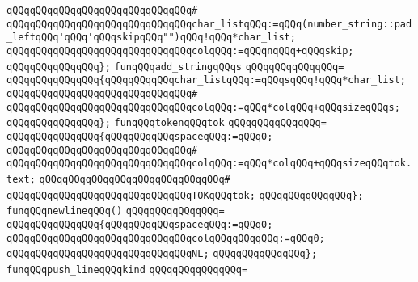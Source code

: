 \verb|qQQqqQQqqQQqqQQqqQQqqQQqqQQqqQQq#|\newline
\verb|qQQqqQQqqQQqqQQqqQQqqQQqqQQqqQQqchar_listqQQq:=qQQq(number_string::pad_leftqQQq'qQQq'qQQqskipqQQq"")qQQq!qQQq*char_list;|\newline
\verb|qQQqqQQqqQQqqQQqqQQqqQQqqQQqqQQqcolqQQq:=qQQqnqQQq+qQQqskip;|\newline
\verb|qQQqqQQqqQQqqQQq};|\newline
\newline
\verb|funqQQqadd_stringqQQqs|\newline
\verb|qQQqqQQqqQQqqQQq=|\newline
\verb|qQQqqQQqqQQqqQQq{qQQqqQQqqQQqchar_listqQQq:=qQQqsqQQq!qQQq*char_list;|\newline
\verb|qQQqqQQqqQQqqQQqqQQqqQQqqQQqqQQq#|\newline
\verb|qQQqqQQqqQQqqQQqqQQqqQQqqQQqqQQqcolqQQq:=qQQq*colqQQq+qQQqsizeqQQqs;|\newline
\verb|qQQqqQQqqQQqqQQq};|\newline
\newline
\verb|funqQQqtokenqQQqtok|\newline
\verb|qQQqqQQqqQQqqQQq=|\newline
\verb|qQQqqQQqqQQqqQQq{qQQqqQQqqQQqspaceqQQq:=qQQq0;|\newline
\verb|qQQqqQQqqQQqqQQqqQQqqQQqqQQqqQQq#|\newline
\verb|qQQqqQQqqQQqqQQqqQQqqQQqqQQqqQQqcolqQQq:=qQQq*colqQQq+qQQqsizeqQQqtok.text;|\newline
\verb|qQQqqQQqqQQqqQQqqQQqqQQqqQQqqQQq#|\newline
\verb|qQQqqQQqqQQqqQQqqQQqqQQqqQQqqQQqTOKqQQqtok;|\newline
\verb|qQQqqQQqqQQqqQQq};|\newline
\newline
\verb|funqQQqnewlineqQQq()|\newline
\verb|qQQqqQQqqQQqqQQq=|\newline
\verb|qQQqqQQqqQQqqQQq{qQQqqQQqqQQqspaceqQQq:=qQQq0;|\newline
\verb|qQQqqQQqqQQqqQQqqQQqqQQqqQQqqQQqcolqQQqqQQqqQQq:=qQQq0;|\newline
\verb|qQQqqQQqqQQqqQQqqQQqqQQqqQQqqQQqNL;|\newline
\verb|qQQqqQQqqQQqqQQq};|\newline
\newline
\verb|funqQQqpush_lineqQQqkind|\newline
\verb|qQQqqQQqqQQqqQQq=|\newline
